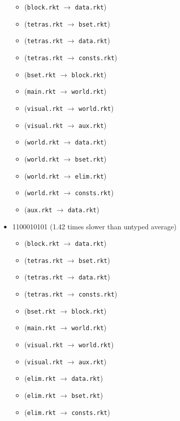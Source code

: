\documentclass{article}
\newcommand{\mono}[1]{\texttt{#1}}
\begin{document}
\begin{itemize}
  \begin{itemize}
  \item (\mono{block.rkt} $\rightarrow$ \mono{data.rkt})
  \item (\mono{tetras.rkt} $\rightarrow$ \mono{bset.rkt})
  \item (\mono{tetras.rkt} $\rightarrow$ \mono{data.rkt})
  \item (\mono{tetras.rkt} $\rightarrow$ \mono{consts.rkt})
  \item (\mono{bset.rkt} $\rightarrow$ \mono{block.rkt})
  \item (\mono{main.rkt} $\rightarrow$ \mono{world.rkt})
  \item (\mono{visual.rkt} $\rightarrow$ \mono{world.rkt})
  \item (\mono{visual.rkt} $\rightarrow$ \mono{aux.rkt})
  \item (\mono{world.rkt} $\rightarrow$ \mono{data.rkt})
  \item (\mono{world.rkt} $\rightarrow$ \mono{bset.rkt})
  \item (\mono{world.rkt} $\rightarrow$ \mono{elim.rkt})
  \item (\mono{world.rkt} $\rightarrow$ \mono{consts.rkt})
  \item (\mono{aux.rkt} $\rightarrow$ \mono{data.rkt})
  \end{itemize}
\item 1100010101 (1.42 times slower than untyped average)
  \begin{itemize}
  \item (\mono{block.rkt} $\rightarrow$ \mono{data.rkt})
  \item (\mono{tetras.rkt} $\rightarrow$ \mono{bset.rkt})
  \item (\mono{tetras.rkt} $\rightarrow$ \mono{data.rkt})
  \item (\mono{tetras.rkt} $\rightarrow$ \mono{consts.rkt})
  \item (\mono{bset.rkt} $\rightarrow$ \mono{block.rkt})
  \item (\mono{main.rkt} $\rightarrow$ \mono{world.rkt})
  \item (\mono{visual.rkt} $\rightarrow$ \mono{world.rkt})
  \item (\mono{visual.rkt} $\rightarrow$ \mono{aux.rkt})
  \item (\mono{elim.rkt} $\rightarrow$ \mono{data.rkt})
  \item (\mono{elim.rkt} $\rightarrow$ \mono{bset.rkt})
  \item (\mono{elim.rkt} $\rightarrow$ \mono{consts.rkt})

\end{itemize}
\end{itemize}
\end{document}
